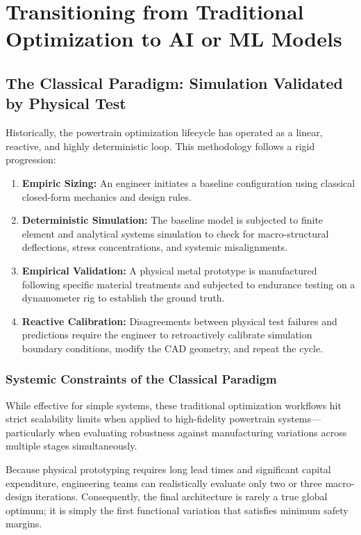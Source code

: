 \chapter{Transitioning from Traditional Optimization to AI or ML Models}
\section{The Classical Paradigm: Simulation Validated by Physical Test}
    Historically, the powertrain optimization lifecycle has operated as a linear, reactive, and 
    highly deterministic loop. This methodology follows a rigid progression:
        \begin{enumerate}
            \item \textbf{Empiric Sizing:} An engineer initiates a baseline configuration using classical closed-form mechanics and design rules.
            \item \textbf{Deterministic Simulation:} The baseline model is subjected to finite element and analytical systems simulation to check for macro-structural deflections, stress concentrations, and systemic misalignments.
            \item \textbf{Empirical Validation:} A physical metal prototype is manufactured following specific material treatments and subjected to endurance testing on a dynamometer rig to establish the ground truth.
            \item \textbf{Reactive Calibration:} Disagreements between physical test failures and predictions require the engineer to retroactively calibrate simulation boundary conditions, modify the CAD geometry, and repeat the cycle.
        \end{enumerate}

    \subsection{Systemic Constraints of the Classical Paradigm}
        While effective for simple systems, these traditional optimization workflows hit strict 
        scalability limits when applied to high-fidelity powertrain systems—particularly when evaluating 
        robustness against manufacturing variations across multiple stages simultaneously.

        Because physical prototyping requires long lead times and significant capital expenditure, 
        engineering teams can realistically evaluate only two or three macro-design iterations. 
        Consequently, the final architecture is rarely a true global optimum; it is simply the first 
        functional variation that satisfies minimum safety margins.

